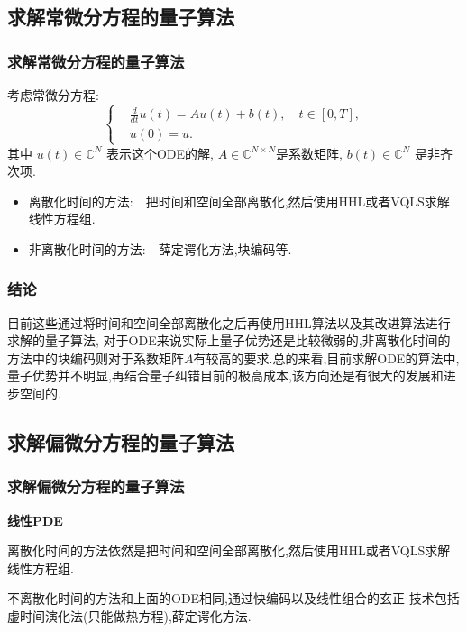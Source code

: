 \documentclass{beamer}
\begin{document}
\begin{spacing}{1.2}
{     \subsection{求解常微分方程的量子算法}
     \begin{frame}
    	\frametitle{求解常微分方程的量子算法}
    	考虑常微分方程:
    	\begin{equation*}\label{eqn:ODE_general}
    		\left\{\begin{aligned}
    			&\frac{d}{dt} u(t)= Au(t) + b(t), \quad t \in [0,T], \\
    			&u(0) = u.
    		\end{aligned}\right.
    	\end{equation*}
    	其中 $u(t) \in \mathbb{C}^N$ 表示这个ODE的解, $A \in \mathbb{C}^{N\times N}$是系数矩阵,  $b(t) \in \mathbb{C}^N$ 是非齐次项. 
    	\vspace{10pt}
    	\begin{itemize}
    		\item 离散化时间的方法:~~把时间和空间全部离散化,然后使用HHL或者VQLS求解线性方程组.
    		\item 非离散化时间的方法:~~薛定谔化方法,块编码等.
    	\end{itemize}
    \end{frame}
    \begin{frame} 
    	\frametitle{结论}
       目前这些通过将时间和空间全部离散化之后再使用HHL算法以及其改进算法进行
     求解的量子算法, 对于ODE来说实际上量子优势还是比较微弱的,非离散化时间的方法中的块编码则对于系数矩阵$A$有较高的要求.总的来看,目前求解ODE的算法中,量子优势并不明显,再结合量子纠错目前的极高成本,该方向还是有很大的发展和进步空间的.
     \end{frame}
     
     \subsection{求解偏微分方程的量子算法}
     \begin{frame}
     	\frametitle{求解偏微分方程的量子算法}
     	\textbf{线性PDE}
     	
     	离散化时间的方法依然是把时间和空间全部离散化,然后使用HHL或者VQLS求解线性方程组.
     	
     	不离散化时间的方法和上面的ODE相同,通过快编码以及线性组合的玄正
     	技术包括虚时间演化法(只能做热方程),薛定谔化方法.


\end{frame}}
\end{spacing}
\end{document}
